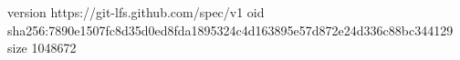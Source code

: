 version https://git-lfs.github.com/spec/v1
oid sha256:7890e1507fc8d35d0ed8fda1895324c4d163895e57d872e24d336c88bc344129
size 1048672
